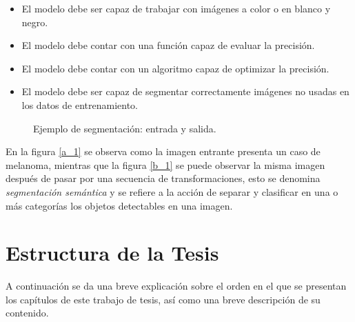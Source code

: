 \begin{itemize}
    \item El modelo debe ser capaz de trabajar con imágenes a color o en blanco y negro.
    \item El modelo debe contar con una función capaz de evaluar la precisión.
    \item El modelo debe contar con un algoritmo capaz de optimizar la precisión.
    \item El modelo debe ser capaz de segmentar correctamente imágenes no usadas en los datos de entrenamiento.
\end{itemize}

\begin{figure}[!htp]
    \centering
    \qquad
    \caption{Ejemplo de segmentación: entrada y salida.}
    \label{data_1}
\end{figure}

En la figura \ref{a_1} se observa como la imagen entrante presenta un caso de melanoma, mientras que la figura \ref{b_1} se puede observar la misma imagen después de pasar por una secuencia de transformaciones, esto se denomina \emph{segmentación semántica} y se refiere a la acción de separar y clasificar en una o más categorías los objetos detectables en una imagen.

\section{Estructura de la Tesis}
A continuación se da una breve explicación sobre el orden en el que se presentan los capítulos de este trabajo de tesis, así como una breve descripción de su contenido.

